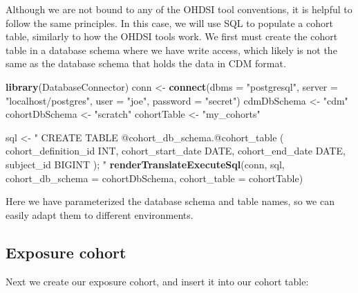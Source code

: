 \documentclass[11pt]{book}
\newenvironment{Shaded}{\begin{snugshade}}{\end{snugshade}}
\newcommand{\KeywordTok}[1]{\textcolor[rgb]{0.13,0.29,0.53}{\textbf{#1}}}
\newcommand{\DataTypeTok}[1]{\textcolor[rgb]{0.13,0.29,0.53}{#1}}
\newcommand{\StringTok}[1]{\textcolor[rgb]{0.31,0.60,0.02}{#1}}
\newcommand{\NormalTok}[1]{#1}
\begin{document}
Although we are not bound to any of the OHDSI tool conventions, it is
helpful to follow the same principles. In this case, we will use SQL to
populate a cohort table, similarly to how the OHDSI tools work. We first
must create the cohort table in a database schema where we have write
access, which likely is not the same as the database schema that holds
the data in CDM format.

\begin{Shaded}
\begin{Highlighting}[]
\KeywordTok{library}\NormalTok{(DatabaseConnector)}
\NormalTok{conn <-}\StringTok{ }\KeywordTok{connect}\NormalTok{(}\DataTypeTok{dbms =} \StringTok{"postgresql"}\NormalTok{,}
                \DataTypeTok{server =} \StringTok{"localhost/postgres"}\NormalTok{,}
                \DataTypeTok{user =} \StringTok{"joe"}\NormalTok{,}
                \DataTypeTok{password =} \StringTok{"secret"}\NormalTok{)}
\NormalTok{cdmDbSchema <-}\StringTok{ "cdm"}
\NormalTok{cohortDbSchema <-}\StringTok{ "scratch"}
\NormalTok{cohortTable <-}\StringTok{ "my_cohorts"}

\NormalTok{sql <-}\StringTok{ "}
\StringTok{CREATE TABLE @cohort_db_schema.@cohort_table (}
\StringTok{  cohort_definition_id INT,}
\StringTok{  cohort_start_date DATE,}
\StringTok{  cohort_end_date DATE,}
\StringTok{  subject_id BIGINT}
\StringTok{);}
\StringTok{"}
\KeywordTok{renderTranslateExecuteSql}\NormalTok{(conn, sql,}
                          \DataTypeTok{cohort_db_schema =}\NormalTok{ cohortDbSchema,}
                          \DataTypeTok{cohort_table =}\NormalTok{ cohortTable)}
\end{Highlighting}
\end{Shaded}

Here we have parameterized the database schema and table names, so we
can easily adapt them to different environments.

\subsection{Exposure cohort}\label{exposure-cohort}

Next we create our exposure cohort, and insert it into our cohort table:
\end{document}
